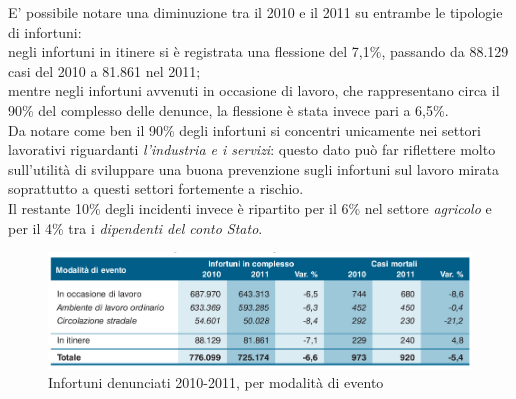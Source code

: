 E' possibile notare una diminuzione tra il 2010 e il 2011 su entrambe le tipologie di infortuni:\\
negli infortuni in itinere si è registrata una flessione del 7,1\%, passando da 88.129 casi del 2010 a 81.861 nel 2011;\\
mentre negli infortuni avvenuti in occasione di lavoro, che rappresentano circa il 90\% del complesso delle denunce, la flessione è stata invece pari a 6,5\%.\\
Da notare come ben il 90\% degli infortuni si concentri unicamente nei settori lavorativi riguardanti \textit{l'industria e i servizi}: questo dato può far riflettere molto sull'utilità di sviluppare una buona prevenzione sugli infortuni sul lavoro mirata soprattutto a questi settori fortemente a rischio.\\
Il restante 10\% degli incidenti invece è ripartito per il 6\% nel settore \textit{agricolo} e per il 4\% tra i \textit{dipendenti del conto Stato}.


\begin{figure}[H]
\centering
\includegraphics[scale=0.5]{images/cap4/analisiDiMercato/infortuniPerModalita}
\caption{Infortuni denunciati 2010-2011, per modalità di evento}
\end{figure}


